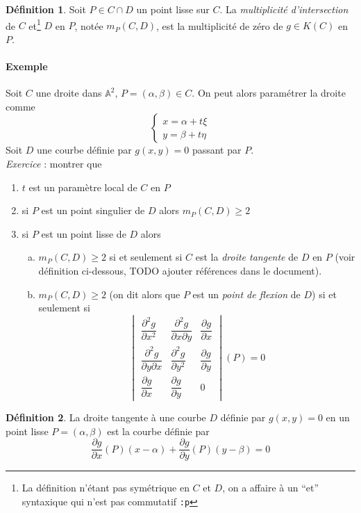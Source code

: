 \documentclass[a4paper, 11pt]{article}
\theoremstyle{definition}
\newtheorem{définition}{Définition}
\newcommand{\aff}{\mathbb{A}}
\newcommand{\derivp}[2]{\dfrac{\partial #1}{\partial #2}}
\newcommand{\derivpp}[2]{\dfrac{\partial^2 #1}{\partial {#2}^2}}
\newcommand{\derivpmix}[3]{\dfrac{\partial^2 #1}{\partial #2 \partial #3}}
\begin{document}
\begin{définition}
  Soit $P \in C \cap D$ un point lisse sur $C$. La \emph{multiplicité
    d'intersection} de $C$ et\footnote{La définition n'étant pas
    symétrique en $C$ et $D$, on a affaire à un \enquote{et}
    syntaxique qui n'est pas commutatif \texttt{:p}} $D$ en $P$, notée
  $m_P(C, D)$, est la multiplicité de zéro de $g \in K(C)$ en $P$.
\end{définition}

\paragraph{Exemple} Soit $C$ une droite dans $\aff^2$,
$P = (\alpha, \beta) \in C$. On peut alors paramétrer la droite comme
\[
\begin{cases}
  x = \alpha + t\xi \\
  y = \beta + t\eta
\end{cases}
\]
Soit $D$ une courbe définie par $g(x,y)=0$ passant par
$P$. \\ \textit{Exercice} : montrer que
\begin{enumerate}
\item $t$ est un paramètre local de $C$ en $P$
\item si $P$ est un point singulier de $D$ alors $m_P(C,D) \geq 2$
\item si $P$ est un point lisse de $D$ alors 
  \begin{enumerate}[(a)]
  \item $m_P(C,D) \geq 2$ si et seulement si $C$ est la \emph{droite
      tangente} de $D$ en $P$ (voir définition ci-dessous, TODO
    ajouter références dans le document).
  \item $m_P(C,D) \geq 2$ (on dit alors que $P$ est un \emph{point de
      flexion} de $D$) si et seulement si
\[
\begin{vmatrix}
\derivpp{g}{x} & \derivpmix{g}{x}{y} & \derivp{g}{x} \\
\derivpmix{g}{y}{x} & \derivpp{g}{y} & \derivp{g}{y} \\
\derivp{g}{x}       & \derivp{g}{y}  & 0
\end{vmatrix}
(P) = 0
\]
  \end{enumerate}
\end{enumerate}

\begin{définition}
  La droite tangente à une courbe $D$ définie par $g(x,y)=0$ en un
  point lisse $P = (\alpha, \beta)$ est la courbe définie par
  \[ \derivp{g}{x}(P)(x-\alpha) + \derivp{g}{y}(P)(y-\beta) = 0 \]
\end{définition}
\end{document}
